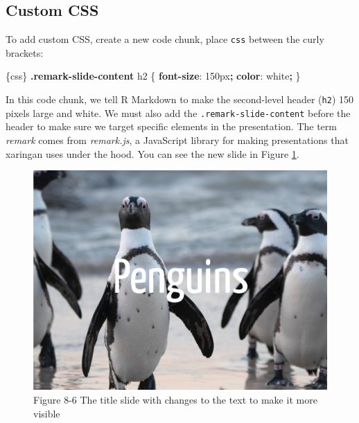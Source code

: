 \documentclass[
]{book}
\newenvironment{Shaded}{\begin{snugshade}}{\end{snugshade}}
\newcommand{\ConstantTok}[1]{\textcolor[rgb]{0.56,0.35,0.01}{#1}}
\newcommand{\DataTypeTok}[1]{\textcolor[rgb]{0.13,0.29,0.53}{#1}}
\newcommand{\DecValTok}[1]{\textcolor[rgb]{0.00,0.00,0.81}{#1}}
\newcommand{\FunctionTok}[1]{\textcolor[rgb]{0.13,0.29,0.53}{\textbf{#1}}}
\newcommand{\KeywordTok}[1]{\textcolor[rgb]{0.13,0.29,0.53}{\textbf{#1}}}
\newcommand{\NormalTok}[1]{#1}
\newcommand{\OperatorTok}[1]{\textcolor[rgb]{0.81,0.36,0.00}{\textbf{#1}}}
\begin{document}
\hypertarget{custom-css}{%
\subsection*{Custom CSS}\label{custom-css}}

To add custom CSS, create a new code chunk, place \texttt{css} between the curly brackets:

\begin{Shaded}
\begin{Highlighting}[]
\NormalTok{\textasciigrave{}\textasciigrave{}\textasciigrave{}\{css\}}
\FunctionTok{.remark{-}slide{-}content}\NormalTok{ h2 \{}
  \KeywordTok{font{-}size}\NormalTok{: }\DecValTok{150}\DataTypeTok{px}\OperatorTok{;}
  \KeywordTok{color}\NormalTok{: }\ConstantTok{white}\OperatorTok{;}
\NormalTok{\}}
\NormalTok{\textasciigrave{}\textasciigrave{}\textasciigrave{}}
\end{Highlighting}
\end{Shaded}

In this code chunk, we tell R Markdown to make the second-level header (\texttt{h2}) 150 pixels large and white. We must also add the \texttt{.remark-slide-content} before the header to make sure we target specific elements in the presentation. The term \emph{remark} comes from \emph{remark.js}, a JavaScript library for making presentations that xaringan uses under the hood. You can see the new slide in Figure \ref{fig:penguins-report}.

\begin{figure}
\includegraphics[width=1\linewidth]{assets/penguins-report} \caption{Figure 8-6 The title slide with changes to the text to make it more visible}\label{fig:penguins-report}
\end{figure}
\end{document}
